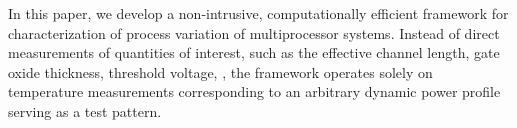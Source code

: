 In this paper, we develop a non-intrusive, computationally efficient framework for characterization of process variation of multiprocessor systems. Instead of direct measurements of quantities of interest, such as the effective channel length, gate oxide thickness, threshold voltage, \etc, the framework operates solely on temperature measurements corresponding to an arbitrary dynamic power profile serving as a test pattern.
